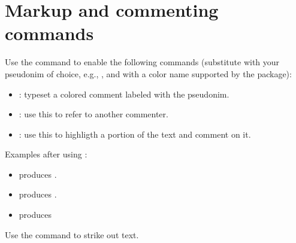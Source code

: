 \section*{Markup and commenting commands}
Use the command  to enable the following commands (substitute  with your pseudonim of choice, e.g., , and  with a color name supported by the  package):
\begin{itemize}
\item {}: typeset a colored comment labeled with the pseudonim.
\item {}: use this to refer to another commenter.
\item {}: use this to highligth a portion of the text and comment on it.
\end{itemize}
Examples after using :
\begin{itemize}
\item {} produces .
\item {} produces \atrtron.
\item {} produces 
\end{itemize}

Use the command  to strike out text.